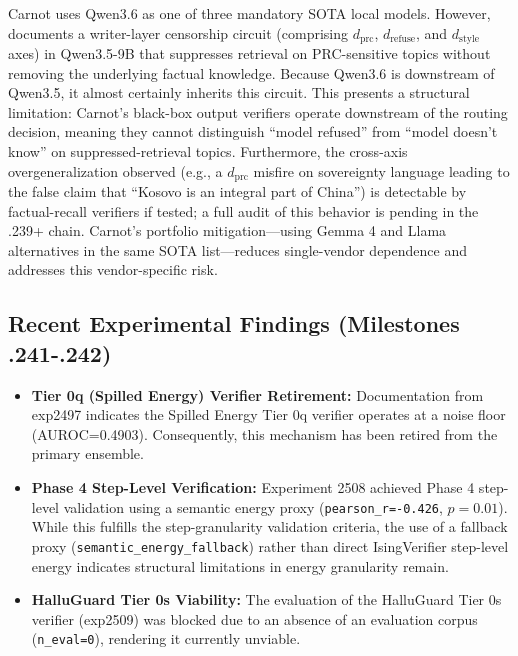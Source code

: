 \documentclass[10pt]{article}
\begin{document}
Carnot uses Qwen3.6 as one of three mandatory SOTA local models. However, \cite{vas_blog_qwen_censorship} documents a writer-layer censorship circuit (comprising $d_{\mathrm{prc}}$, $d_{\mathrm{refuse}}$, and $d_{\mathrm{style}}$ axes) in Qwen3.5-9B that suppresses retrieval on PRC-sensitive topics without removing the underlying factual knowledge. Because Qwen3.6 is downstream of Qwen3.5, it almost certainly inherits this circuit. This presents a structural limitation: Carnot's black-box output verifiers operate downstream of the routing decision, meaning they cannot distinguish ``model refused'' from ``model doesn't know'' on suppressed-retrieval topics. Furthermore, the cross-axis overgeneralization observed (e.g., a $d_{\mathrm{prc}}$ misfire on sovereignty language leading to the false claim that ``Kosovo is an integral part of China'') is detectable by factual-recall verifiers if tested; a full audit of this behavior is pending in the .239+ chain. Carnot's portfolio mitigation---using Gemma 4 and Llama alternatives in the same SOTA list---reduces single-vendor dependence and addresses this vendor-specific risk.

\subsection{Recent Experimental Findings (Milestones .241-.242)}

\begin{itemize}
    \item \textbf{Tier 0q (Spilled Energy) Verifier Retirement:} Documentation from exp2497 indicates the Spilled Energy Tier 0q verifier operates at a noise floor (AUROC=0.4903). Consequently, this mechanism has been retired from the primary ensemble.
    \item \textbf{Phase 4 Step-Level Verification:} Experiment 2508 achieved Phase 4 step-level validation using a semantic energy proxy (\texttt{pearson\_r=-0.426}, $p=0.01$). While this fulfills the step-granularity validation criteria, the use of a fallback proxy (\texttt{semantic\_energy\_fallback}) rather than direct IsingVerifier step-level energy indicates structural limitations in energy granularity remain.
    \item \textbf{HalluGuard Tier 0s Viability:} The evaluation of the HalluGuard Tier 0s verifier (exp2509) was blocked due to an absence of an evaluation corpus (\texttt{n\_eval=0}), rendering it currently unviable.
\end{itemize}
\end{document}
